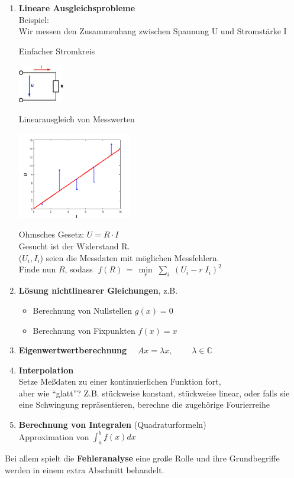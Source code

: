 \begin{enumerate}
\item \textbf{Lineare Ausgleichsprobleme}\\
  Beispiel:\\
  Wir messen den Zusammenhang zwischen Spannung U und
  Stromstärke I
\begin{image}{Einfacher Stromkreis}
  \parbox[c]{3cm}{\includegraphics[width=2cm]{images/ohmsche.jpeg} }
\end{image}
\begin{image}{Linearausgleich von Messwerten}
  \parbox[c]{6cm}{\includegraphics[width=5cm]{images/linausgl2.png}}
\end{image}
  Ohmsches Gesetz: $U = R \cdot I$\\
  Gesucht ist der Widerstand R. \\
  ($U_i, I_i$) seien die Messdaten mit möglichen Messfehlern.\\
  Finde nun $R$, sodass 
  $\; f(R)\, =\,  \min\limits_r \; \sum\limits_i \; (U_i - r \; I_i)^2$
  
\item \textbf{Lösung nichtlinearer Gleichungen},
  z.B.
  \begin{itemize}
  \item Berechnung von Nullstellen $g(x) = 0$
  \item Berechnung von Fixpunkten $f(x) = x$
  \end{itemize}  
\item \textbf{Eigenwertwertberechnung}
  $\quad Ax= \lambda x, \qquad \; \lambda \in \mathbb{C}$
  
  
\item \textbf{Interpolation}\\
  Setze Meßdaten zu einer kontinuierlichen Funktion fort, \\
  aber wie \enquote{glatt}?
  Z.B. stückweise konstant, stückweise linear, oder 
  falls sie
  eine Schwingung repräsentieren, berechne die zugehörige
  Fourierreihe  
  
\item \textbf{Berechnung von Integralen} (Quadraturformeln) \\ 
  Approximation von $\int_a^b f(x)dx$
\end{enumerate}

Bei allem spielt die \textbf{Fehleranalyse} eine große Rolle und
ihre Grundbegriffe werden in einem extra Abschnitt behandelt.

